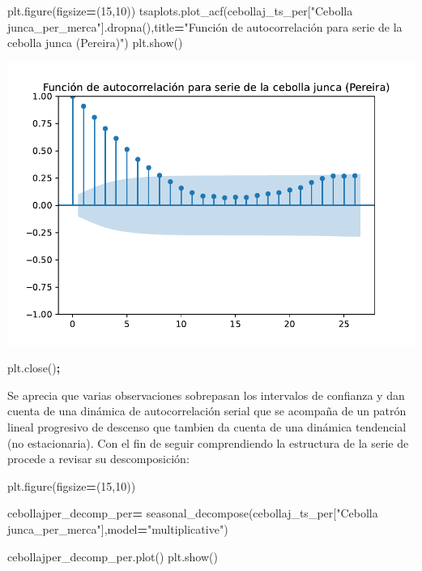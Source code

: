 \documentclass[
]{book}
\newenvironment{Shaded}{\begin{snugshade}}{\end{snugshade}}
\newcommand{\DecValTok}[1]{\textcolor[rgb]{0.00,0.00,0.81}{#1}}
\newcommand{\NormalTok}[1]{#1}
\newcommand{\OperatorTok}[1]{\textcolor[rgb]{0.81,0.36,0.00}{\textbf{#1}}}
\newcommand{\StringTok}[1]{\textcolor[rgb]{0.31,0.60,0.02}{#1}}
\begin{document}
\begin{Shaded}
\begin{Highlighting}[]

\NormalTok{plt.figure(figsize}\OperatorTok{=}\NormalTok{(}\DecValTok{15}\NormalTok{,}\DecValTok{10}\NormalTok{))}
\NormalTok{tsaplots.plot\_acf(cebollaj\_ts\_per[}\StringTok{"Cebolla junca\_per\_merca"}\NormalTok{].dropna(),title}\OperatorTok{=}\StringTok{"Función de autocorrelación para serie de la cebolla junca (Pereira)"}\NormalTok{)}
\NormalTok{plt.show()}
\end{Highlighting}
\end{Shaded}

\includegraphics{bookdown-demo_files/figure-latex/unnamed-chunk-97-75.pdf}

\begin{Shaded}
\begin{Highlighting}[]
\NormalTok{plt.close()}\OperatorTok{;}
\end{Highlighting}
\end{Shaded}

Se aprecia que varias observaciones sobrepasan los intervalos de confianza y dan cuenta de una dinámica de autocorrelación serial que se acompaña de un patrón lineal progresivo de descenso que tambien da cuenta de una dinámica tendencial (no estacionaria). Con el fin de seguir comprendiendo la estructura de la serie de procede a revisar su descomposición:

\begin{Shaded}
\begin{Highlighting}[]

\NormalTok{plt.figure(figsize}\OperatorTok{=}\NormalTok{(}\DecValTok{15}\NormalTok{,}\DecValTok{10}\NormalTok{))}

\NormalTok{cebollajper\_decomp\_per}\OperatorTok{=}\NormalTok{ seasonal\_decompose(cebollaj\_ts\_per[}\StringTok{"Cebolla junca\_per\_merca"}\NormalTok{],model}\OperatorTok{=}\StringTok{"multiplicative"}\NormalTok{)}

\NormalTok{cebollajper\_decomp\_per.plot()}
\NormalTok{plt.show()}
\end{Highlighting}
\end{Shaded}
\end{document}
